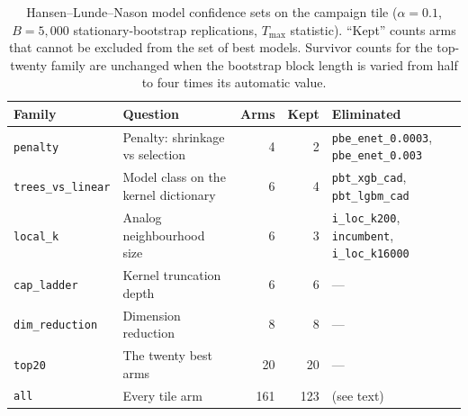 \begin{table}[H]
\centering
\caption{Hansen--Lunde--Nason model confidence sets on the campaign tile ($\alpha = 0.1$, $B = 5,000$ stationary-bootstrap replications, $T_{\max}$ statistic). ``Kept'' counts arms that cannot be excluded from
the set of best models. Survivor counts for the top-twenty family are
unchanged when the bootstrap block length is varied from half to four times
its automatic value.}
\label{tab:mcs}
\begin{tabular}{llrrl}
\toprule
Family & Question & Arms & Kept & Eliminated \\
\midrule
\texttt{penalty} & Penalty: shrinkage vs selection & 4 & 2 & \texttt{pbe\_enet\_0.0003}, \texttt{pbe\_enet\_0.003} \\
\texttt{trees\_vs\_linear} & Model class on the kernel dictionary & 6 & 4 & \texttt{pbt\_xgb\_cad}, \texttt{pbt\_lgbm\_cad} \\
\texttt{local\_k} & Analog neighbourhood size & 6 & 3 & \texttt{i\_loc\_k200}, \texttt{incumbent}, \texttt{i\_loc\_k16000} \\
\texttt{cap\_ladder} & Kernel truncation depth & 6 & 6 & --- \\
\texttt{dim\_reduction} & Dimension reduction & 8 & 8 & --- \\
\texttt{top20} & The twenty best arms & 20 & 20 & --- \\
\texttt{all} & Every tile arm & 161 & 123 & (see text) \\
\bottomrule
\end{tabular}
\end{table}
